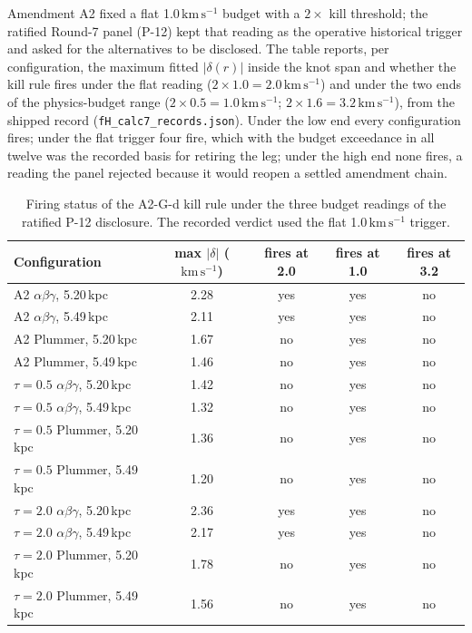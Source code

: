 \documentclass[11pt]{article}
\newcommand{\kms}{\ensuremath{\mathrm{km\,s^{-1}}}}
\begin{document}
Amendment A2 fixed a flat 1.0\,\kms{} budget with a $2\times$ kill threshold; the ratified Round-7 panel (P-12) kept that reading as the operative historical trigger and asked for the alternatives to be disclosed. The table reports, per configuration, the maximum fitted $|\delta(r)|$ inside the knot span and whether the kill rule fires under the flat reading ($2\times1.0 = 2.0\,\kms$) and under the two ends of the physics-budget range ($2\times0.5 = 1.0\,\kms$; $2\times1.6 = 3.2\,\kms$), from the shipped record (\texttt{fH\_calc7\_records.json}). Under the low end every configuration fires; under the flat trigger four fire, which with the budget exceedance in all twelve was the recorded basis for retiring the leg; under the high end none fires, a reading the panel rejected because it would reopen a settled amendment chain.

\begin{table}[htbp]
\centering
\small
\begin{tabular}{lcccc}
\toprule
Configuration & max $|\delta|$ (\kms) & fires at 2.0 & fires at 1.0 & fires at 3.2 \\
\midrule
A2 $\alpha\beta\gamma$, 5.20\,kpc & 2.28 & yes & yes & no \\
A2 $\alpha\beta\gamma$, 5.49\,kpc & 2.11 & yes & yes & no \\
A2 Plummer, 5.20\,kpc & 1.67 & no & yes & no \\
A2 Plummer, 5.49\,kpc & 1.46 & no & yes & no \\
$\tau{=}0.5$ $\alpha\beta\gamma$, 5.20\,kpc & 1.42 & no & yes & no \\
$\tau{=}0.5$ $\alpha\beta\gamma$, 5.49\,kpc & 1.32 & no & yes & no \\
$\tau{=}0.5$ Plummer, 5.20\,kpc & 1.36 & no & yes & no \\
$\tau{=}0.5$ Plummer, 5.49\,kpc & 1.20 & no & yes & no \\
$\tau{=}2.0$ $\alpha\beta\gamma$, 5.20\,kpc & 2.36 & yes & yes & no \\
$\tau{=}2.0$ $\alpha\beta\gamma$, 5.49\,kpc & 2.17 & yes & yes & no \\
$\tau{=}2.0$ Plummer, 5.20\,kpc & 1.78 & no & yes & no \\
$\tau{=}2.0$ Plummer, 5.49\,kpc & 1.56 & no & yes & no \\
\bottomrule
\end{tabular}
\caption{Firing status of the A2-G-d kill rule under the three budget readings of the ratified P-12 disclosure. The recorded verdict used the flat 1.0\,\kms{} trigger.}
\end{table}
\end{document}
